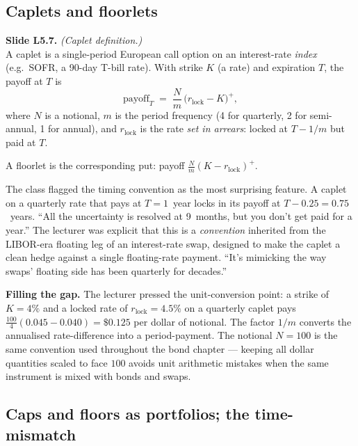 \subsection{Caplets and floorlets}\label{L5-sec:caplets}

\begin{keyblock}
\textbf{Slide L5.7.} \emph{(Caplet definition.)}\\
A caplet is a single-period European call option on an interest-rate
\emph{index} (e.g.\ SOFR, a 90-day T-bill rate). With strike $K$ (a
rate) and expiration $T$, the payoff at $T$ is
\[
  \text{payoff}_T \;=\; \frac{N}{m}\,\bigl(r_{\text{lock}} - K\bigr)^+,
\]
where $N$ is a notional, $m$ is the period frequency (4 for quarterly,
2 for semi-annual, 1 for annual), and $r_{\text{lock}}$ is the rate
\emph{set in arrears}: locked at $T - 1/m$ but paid at $T$.

A floorlet is the corresponding put: payoff
$\frac{N}{m}(K - r_{\text{lock}})^+$.
\end{keyblock}

The class flagged the timing convention as the most surprising feature.
A caplet on a quarterly rate that pays at $T = 1$~year locks in its
payoff at $T - 0.25 = 0.75$~years. ``All the uncertainty is resolved at
9~months, but you don't get paid for a year.'' The lecturer was
explicit that this is a \emph{convention} inherited from the LIBOR-era
floating leg of an interest-rate swap, designed to make the caplet a
clean hedge against a single floating-rate payment. ``It's mimicking
the way swaps' floating side has been quarterly for decades.''

\begin{tipblock}
\textbf{Filling the gap.} The lecturer pressed the unit-conversion
point: a strike of $K = 4\%$ and a locked rate of $r_{\text{lock}} =
4.5\%$ on a quarterly caplet pays $\frac{100}{4}(0.045 - 0.040) =
\$0.125$ per dollar of notional. The factor $1/m$ converts the
annualised rate-difference into a period-payment. The notional $N=
100$ is the same convention used throughout the bond chapter ---
keeping all dollar quantities scaled to face $100$ avoids unit
arithmetic mistakes when the same instrument is mixed with bonds and
swaps.
\end{tipblock}

\subsection{Caps and floors as portfolios; the time-mismatch}\label{L5-sec:caps-portfolio}

